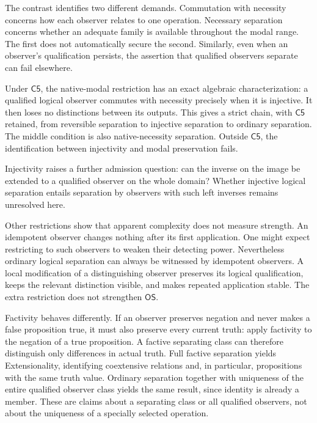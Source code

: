 \documentclass[12pt,letterpaper]{article}
\newcommand{\Cfive}{\mathsf{C5}}
\newcommand{\OS}{\mathsf{OS}}
\begin{document}
The contrast identifies two different demands. Commutation with necessity concerns how each observer relates to one operation. Necessary separation concerns whether an adequate family is available throughout the modal range. The first does not automatically secure the second. Similarly, even when an observer's qualification persists, the assertion that qualified observers separate can fail elsewhere.


Under $\Cfive$, the native-modal restriction has an exact algebraic characterization: a qualified logical observer commutes with necessity precisely when it is injective. It then loses no distinctions between its outputs. This gives a strict chain, with $\Cfive$ retained, from reversible separation to injective separation to ordinary separation. The middle condition is also native-necessity separation. Outside $\Cfive$, the identification between injectivity and modal preservation fails.~\cite[\S\S3, 7]{r10}


Injectivity raises a further admission question: can the inverse on the image be extended to a qualified observer on the whole domain? Whether injective logical separation entails separation by observers with such left inverses remains unresolved here.


Other restrictions show that apparent complexity does not measure strength. An idempotent observer changes nothing after its first application. One might expect restricting to such observers to weaken their detecting power. Nevertheless ordinary logical separation can always be witnessed by idempotent observers. A local modification of a distinguishing observer preserves its logical qualification, keeps the relevant distinction visible, and makes repeated application stable. The extra restriction does not strengthen $\OS$.~\cite[\S8]{r9}


Factivity behaves differently. If an observer preserves negation and never makes a false proposition true, it must also preserve every current truth: apply factivity to the negation of a true proposition. A factive separating class can therefore distinguish only differences in actual truth. Full factive separation yields Extensionality, identifying coextensive relations and, in particular, propositions with the same truth value. Ordinary separation together with uniqueness of the entire qualified observer class yields the same result, since identity is already a member. These are claims about a separating class or all qualified observers, not about the uniqueness of a specially selected operation.~\cite[\S2]{r9}
\end{document}
